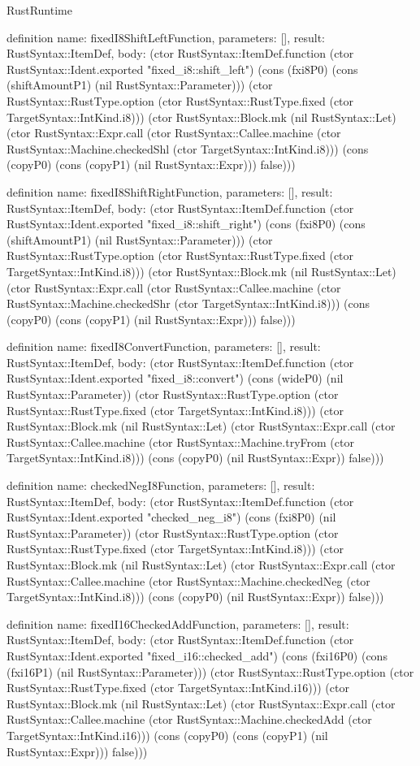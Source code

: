 \begin{lexlean}{RustRuntime}
\begin{semanticmodule}
definition{
  name: fixedI8ShiftLeftFunction,
  parameters: [],
  result: RustSyntax::ItemDef,
  body: (ctor RustSyntax::ItemDef.function (ctor RustSyntax::Ident.exported "fixed_i8::shift_left") (cons (fxi8P0) (cons (shiftAmountP1) (nil RustSyntax::Parameter))) (ctor RustSyntax::RustType.option (ctor RustSyntax::RustType.fixed (ctor TargetSyntax::IntKind.i8))) (ctor RustSyntax::Block.mk (nil RustSyntax::Let) (ctor RustSyntax::Expr.call (ctor RustSyntax::Callee.machine (ctor RustSyntax::Machine.checkedShl (ctor TargetSyntax::IntKind.i8))) (cons (copyP0) (cons (copyP1) (nil RustSyntax::Expr))) false)))
}

definition{
  name: fixedI8ShiftRightFunction,
  parameters: [],
  result: RustSyntax::ItemDef,
  body: (ctor RustSyntax::ItemDef.function (ctor RustSyntax::Ident.exported "fixed_i8::shift_right") (cons (fxi8P0) (cons (shiftAmountP1) (nil RustSyntax::Parameter))) (ctor RustSyntax::RustType.option (ctor RustSyntax::RustType.fixed (ctor TargetSyntax::IntKind.i8))) (ctor RustSyntax::Block.mk (nil RustSyntax::Let) (ctor RustSyntax::Expr.call (ctor RustSyntax::Callee.machine (ctor RustSyntax::Machine.checkedShr (ctor TargetSyntax::IntKind.i8))) (cons (copyP0) (cons (copyP1) (nil RustSyntax::Expr))) false)))
}

definition{
  name: fixedI8ConvertFunction,
  parameters: [],
  result: RustSyntax::ItemDef,
  body: (ctor RustSyntax::ItemDef.function (ctor RustSyntax::Ident.exported "fixed_i8::convert") (cons (wideP0) (nil RustSyntax::Parameter)) (ctor RustSyntax::RustType.option (ctor RustSyntax::RustType.fixed (ctor TargetSyntax::IntKind.i8))) (ctor RustSyntax::Block.mk (nil RustSyntax::Let) (ctor RustSyntax::Expr.call (ctor RustSyntax::Callee.machine (ctor RustSyntax::Machine.tryFrom (ctor TargetSyntax::IntKind.i8))) (cons (copyP0) (nil RustSyntax::Expr)) false)))
}

definition{
  name: checkedNegI8Function,
  parameters: [],
  result: RustSyntax::ItemDef,
  body: (ctor RustSyntax::ItemDef.function (ctor RustSyntax::Ident.exported "checked_neg_i8") (cons (fxi8P0) (nil RustSyntax::Parameter)) (ctor RustSyntax::RustType.option (ctor RustSyntax::RustType.fixed (ctor TargetSyntax::IntKind.i8))) (ctor RustSyntax::Block.mk (nil RustSyntax::Let) (ctor RustSyntax::Expr.call (ctor RustSyntax::Callee.machine (ctor RustSyntax::Machine.checkedNeg (ctor TargetSyntax::IntKind.i8))) (cons (copyP0) (nil RustSyntax::Expr)) false)))
}

definition{
  name: fixedI16CheckedAddFunction,
  parameters: [],
  result: RustSyntax::ItemDef,
  body: (ctor RustSyntax::ItemDef.function (ctor RustSyntax::Ident.exported "fixed_i16::checked_add") (cons (fxi16P0) (cons (fxi16P1) (nil RustSyntax::Parameter))) (ctor RustSyntax::RustType.option (ctor RustSyntax::RustType.fixed (ctor TargetSyntax::IntKind.i16))) (ctor RustSyntax::Block.mk (nil RustSyntax::Let) (ctor RustSyntax::Expr.call (ctor RustSyntax::Callee.machine (ctor RustSyntax::Machine.checkedAdd (ctor TargetSyntax::IntKind.i16))) (cons (copyP0) (cons (copyP1) (nil RustSyntax::Expr))) false)))
}


\end{semanticmodule}
\end{lexlean}
